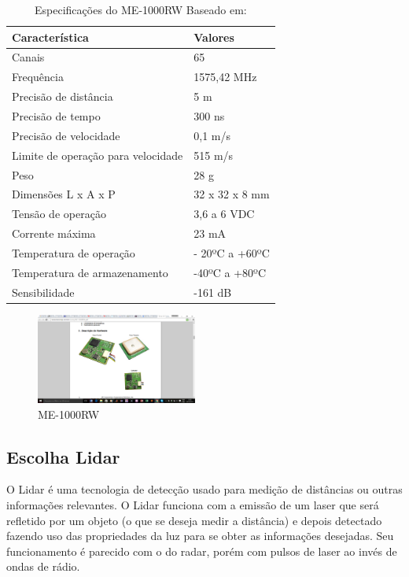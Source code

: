 \begin{table}[ht]
\caption{Especificações do ME-1000RW Baseado em: \cite{11gps}}
\centering
\begin{tabular}{| l |  p{5cm} |}
\hline
Característica & Valores \\
\hline
Canais & 65 \\
\hline
Frequência & 1575,42 MHz \\
\hline
Precisão de distância & 5 m \\
\hline
Precisão de tempo & 300 ns \\
\hline
Precisão de velocidade & 0,1 m/s \\
\hline
Limite de operação para velocidade & 515 m/s \\
\hline
Peso & 28 g \\
\hline
Dimensões L x A x P & 32 x 32 x 8 mm \\
\hline
Tensão de operação & 3,6 a 6 VDC \\
\hline
Corrente máxima & 23 mA \\
\hline
Temperatura de operação & - 20ºC a +60ºC \\
\hline
Temperatura de armazenamento & -40ºC a +80ºC \\
\hline
Sensibilidade & -161 dB \\
\hline
\end{tabular}
\label{table:especificacao_gps_me1000}
\end{table}


\begin{figure}[h]
  \centering
  \includegraphics[width=200px, scale=1]{figuras/gps_me1000}
  \caption{ME-1000RW \cite{11gps}}
\label{fig:gps_me1000}
\end{figure}



\subsection{Escolha Lidar}

O Lidar é uma tecnologia de detecção usado para medição de distâncias ou
outras informações relevantes. O Lidar funciona com a emissão de um laser
que será refletido por um objeto (o que se deseja medir a distância) e depois
detectado fazendo uso das propriedades da luz para se obter as informações
desejadas. Seu funcionamento é parecido com o do radar, porém com pulsos de
laser ao invés de ondas de rádio.


